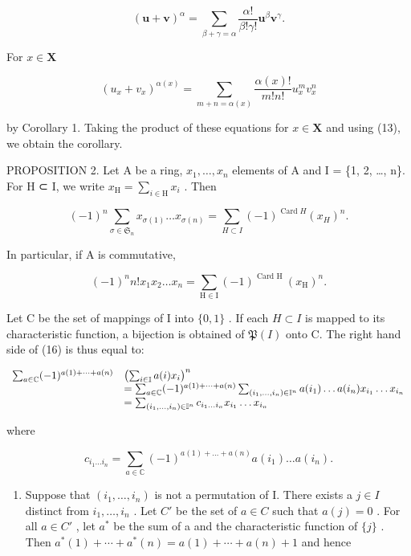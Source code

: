 \[
(\mathbf {u} + \mathbf {v}) ^ {\alpha} = \sum_ {\beta + \gamma = \alpha} \frac {\alpha !}{\beta ! \gamma !} \mathbf {u} ^ {\beta} \mathbf {v} ^ {\gamma}.
\]

For \(x\in \mathbf{X}\)

\[
(u _ {x} + v _ {x}) ^ {\alpha (x)} = \sum_ {m + n = \alpha (x)} \frac {\alpha (x) !}{m ! n !} u _ {x} ^ {m} v _ {x} ^ {n}
\]

by Corollary 1. Taking the product of these equations for \(x \in \mathbf{X}\) and using (13), we obtain the corollary.

PROPOSITION 2. Let A be a ring, \(x_{1}, \ldots, x_{n}\) elements of A and I = \{1, 2, \ldots, n\}. For H ⊂ I, we write \(x_{\mathrm{H}} = \sum_{i \in \mathrm{H}} x_{i}\) . Then

\[
(- 1) ^ {n} \sum_ {\sigma \in \mathfrak {S} _ {n}} x _ {\sigma (1)} \dots x _ {\sigma (n)} = \sum_ {H \subset I} (- 1) ^ {\operatorname{Card} H} (x _ {H}) ^ {n}.\tag{16}
\]

In particular, if A is commutative,

\[
(- 1) ^ {n} n! x _ {1} x _ {2} \dots x _ {n} = \sum_ {\mathrm{H} \in \mathrm{I}} (- 1) ^ {\text { Card   H }} (x _ {\mathrm{H}}) ^ {n}.
\]

Let C be the set of mappings of I into \(\{0,1\}\) . If each \(H \subset I\) is mapped to its characteristic function, a bijection is obtained of \(\mathfrak{P}(I)\) onto C. The right hand side of (16) is thus equal to:

\[
\begin{array}{r l} \sum_ {a \in \mathbb {C}} (- 1) ^ {a (1) + \dots + a (n)} & \left(\sum_ {i \in \mathbb {I}} a (i) x _ {i}\right) ^ {n} \\ & = \sum_ {a \in \mathbb {C}} (- 1) ^ {a (1) + \dots + a (n)} \sum_ {(i _ {1}, \ldots , i _ {n}) \in \mathbb {I} ^ {n}} a (i _ {1}) \ldots a (i _ {n}) x _ {i _ {1}} \ldots x _ {i _ {n}} \\ & = \sum_ {(i _ {1}, \ldots , i _ {n}) \in \mathbb {I} ^ {n}} c _ {i _ {1} \ldots i _ {n}} x _ {i _ {1}} \ldots x _ {i _ {n}} \end{array}
\]

where

\[
c _ {i _ {1} \dots i _ {n}} = \sum_ {a \in \mathbb {C}} (- 1) ^ {a (1) + \dots + a (n)} a (i _ {1}) \dots a (i _ {n}).
\]

\begin{enumerate}
\def\labelenumi{(\arabic{enumi})}
\tightlist
\item
  Suppose that \((i_{1},\ldots,i_{n})\) is not a permutation of I. There exists a \(j\in I\) distinct from \(i_{1},\ldots,i_{n}\) . Let \(C'\) be the set of \(a\in C\) such that \(a(j)=0\) . For all \(a\in C'\) , let \(a^{*}\) be the sum of a and the characteristic function of \(\{j\}\) . Then \(a^{*}(1)+\cdots+a^{*}(n)=a(1)+\cdots+a(n)+1\) and hence
\end{enumerate}

